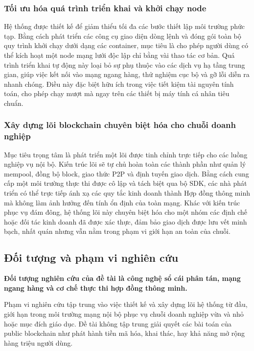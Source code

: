 \documentclass[12pt,a4paper]{article}
\begin{document}
\subsubsection{Tối ưu hóa quá trình triển khai và khởi chạy node}
Hệ thống được thiết kế để giảm thiểu tối đa các bước thiết lập môi trường phức tạp. Bằng cách phát triển các công cụ giao diện dòng lệnh và đóng gói toàn bộ quy trình khởi chạy dưới dạng các container, mục tiêu là cho phép người dùng có thể kích hoạt một node mạng lưới độc lập chỉ bằng vài thao tác cơ bản. Quá trình triển khai tự động này loại bỏ sự phụ thuộc vào các dịch vụ hạ tầng trung gian, giúp việc kết nối vào mạng ngang hàng, thử nghiệm cục bộ và gỡ lỗi diễn ra nhanh chóng. Điều này đặc biệt hữu ích trong việc tiết kiệm tài nguyên tính toán, cho phép chạy mượt mà ngay trên các thiết bị máy tính cá nhân tiêu chuẩn.

\subsubsection{Xây dựng lõi blockchain chuyên biệt hóa cho chuỗi doanh nghiệp}
Mục tiêu trọng tâm là phát triển một lõi được tinh chỉnh trực tiếp cho các luồng nghiệp vụ nội bộ. Kiến trúc lõi sẽ tự chủ hoàn toàn các thành phần như quản lý mempool, đồng bộ block, giao thức P2P và định tuyến giao dịch. Bằng cách cung cấp một môi trường thực thi được cô lập và tách biệt qua bộ SDK, các nhà phát triển có thể trực tiếp ánh xạ các quy tắc kinh doanh thành Hợp đồng thông minh mà không làm ảnh hưởng đến tính ổn định của toàn mạng. Khác với kiến trúc phục vụ đám đông, hệ thống lõi này chuyên biệt hóa cho một nhóm các định chế hoặc đối tác kinh doanh đã được xác thực, đảm bảo giao dịch được lưu vết minh bạch, nhất quán nhưng vẫn nằm trong phạm vi giới hạn an toàn của chuỗi.
\newpage
\subsection{Đối tượng và phạm vi nghiên cứu}
\textbf{Đối tượng nghiên cứu của đề tài là công nghệ sổ cái phân tán, mạng ngang hàng và cơ chế thực thi hợp đồng thông minh.}

Phạm vi nghiên cứu tập trung vào việc thiết kế và xây dựng lõi hệ thống từ đầu, giới hạn trong môi trường mạng nội bộ phục vụ chuỗi doanh nghiệp vừa và nhỏ hoặc mục đích giáo dục. Đề tài không tập trung giải quyết các bài toán của public blockchain như phát hành tiền mã hóa, khai thác, hay khả năng mở rộng hàng triệu người dùng.
\end{document}
